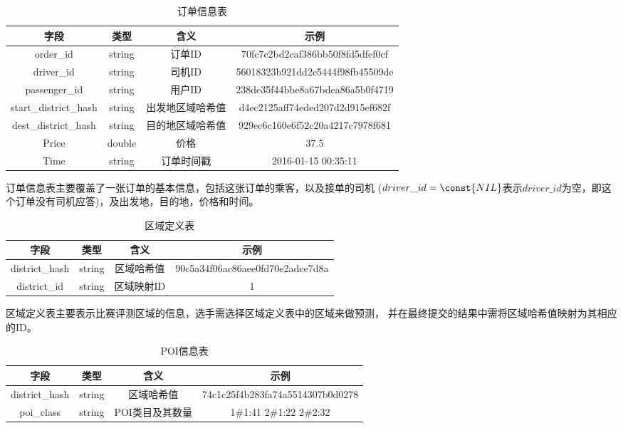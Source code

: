 \documentclass[hyperref,UTF8]{ctexart}
\theoremstyle{definition}
\theoremstyle{remark}
\numberwithin{equation}{subsection}
\begin{document}
	\begin{table}[H]
    \centering
	\caption{订单信息表}
	\begin{tabular}{|c|c|c|c|}
	\hline
	字段	&	类型	&	含义	&	示例		\\
	\hline
	order\_id & string & 订单ID & 70fc7c2bd2caf386bb50f8fd5dfef0cf 		\\
	driver\_id & string & 司机ID & 56018323b921dd2c5444f98fb45509de		\\
	passenger\_id & string & 用户ID & 238de35f44bbe8a67bdea86a5b0f4719	\\
	start\_district\_hash & string & 出发地区域哈希值 & d4ec2125aff74eded207d2d915ef682f	\\
	dest\_district\_hash & string & 目的地区域哈希值 & 929ec6c160e6f52c20a4217c7978f681		\\
	Price & double & 价格 & 37.5	\\
	Time & string & 订单时间戳 & 2016-01-15 00:35:11	\\
	\hline
	\end{tabular}
	\end{table}
	
	订单信息表主要覆盖了一张订单的基本信息，包括这张订单的乘客，以及接单的司机
($driver\_id = \const{NIL}$表示$driver\_id$为空，即这个订单没有司机应答)，及出发地，目的地，价格和时间。
	
	\begin{table}[H]
    \centering
	\caption{区域定义表}
	\begin{tabular}{|c|c|c|c|}
	\hline
	字段	&	类型	&	含义	&	示例		\\
	\hline
	district\_hash & string & 区域哈希值 & 90c5a34f06ac86aee0fd70e2adce7d8a	\\
	district\_id & string & 区域映射ID & 1	\\
	\hline
	\end{tabular}
	\end{table}
	
	区域定义表主要表示比赛评测区域的信息，选手需选择区域定义表中的区域来做预测，
并在最终提交的结果中需将区域哈希值映射为其相应的ID。

	\begin{table}[H]
    \centering
	\caption{POI信息表}
	\begin{tabular}{|c|c|c|c|}
	\hline
	字段	&	类型	&	含义	&	示例		\\
	\hline
	district\_hash & string & 区域哈希值 & 74c1c25f4b283fa74a5514307b0d0278	\\
	poi\_class & string & POI类目及其数量 & 1\#1:41 2\#1:22 2\#2:32			\\
	\hline
	\end{tabular}
	\end{table}
	
\end{document}
